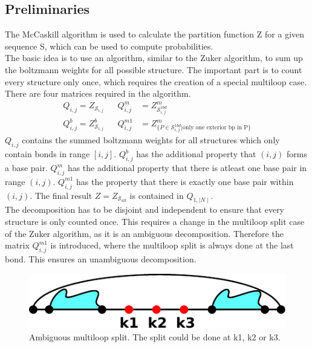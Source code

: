 \documentclass[11pt,a4paper]{report}
\begin{document}
\subsection*{Preliminaries}
The McCaskill algorithm is used to calculate the partition function Z for a given sequence S, which can be used to compute probabilities.\\
The basic idea is to use an algorithm, similar to the Zuker algorithm, to sum up the boltzmann weights for all possible structure. The important part is to count every structure only once, which requires the creation of a special multiloop case.\\
There are four matrices required in the algorithm.
\begin{align*}
Q_{i,j} = Z_{\mathcal{S}_{i,j}} && Q_{i,j}^m &= Z_{\mathcal{S}_{i,j}^{1bd}}^m\\
Q_{i,j}^b = Z_{\mathcal{S}_{i,j}}^b && Q_{i,j}^{m1} &= Z_{\{P\in \mathcal{S}_{i,j}^{1bd}| \text{only one exterior bp in P}\}}^m
\end{align*}
$Q_{i,j}$ contains the summed boltzmann weights for all structures which only contain bonds in range $[i,j]$. $Q_{i,j}^b$ has the additional property that $(i,j)$ forms a base pair. $Q_{i,j}^{m}$ has the additional property that there is atleast one base pair in range $(i,j)$. $Q_{i,j}^{m1}$ has the property that there is exactly one base pair within $(i,j)$. The final result $Z=Z_{\mathcal{S}_{all}}$ is contained in $Q_{1,\mid N\mid}$.\\ %
The decomposition has to be disjoint and independent to ensure that every structure is only counted once. This requires a change in the multiloop split case of the Zuker algorithm, as it is an ambiguous decomposition. Therefore the matrix $Q_{i,j}^{m1}$ is introduced, where the multiloop split is always done at the last bond. This ensures an unambiguous decomposition.\\
\begin{figure}[H]
\centering
\captionsetup{justification=centering,margin=2cm}
\includegraphics[scale=1]{ASplit.pdf}
\caption{Ambiguous multiloop split. The split could be done at k1, k2 or k3.}
\end{figure}
\end{document}
